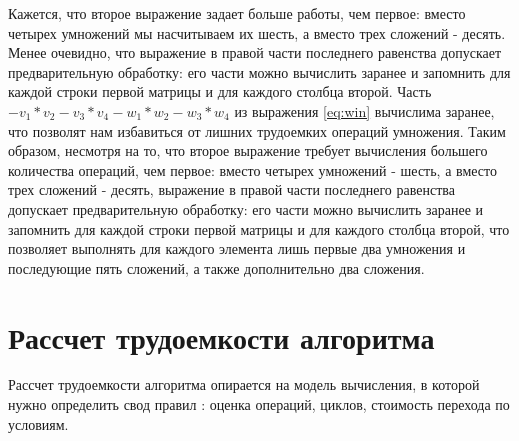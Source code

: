 Кажется, что второе выражение задает больше работы, чем первое: вместо четырех умножений мы насчитываем их шесть, а вместо трех сложений - десять. Менее очевидно, что выражение в правой части последнего равенства допускает предварительную обработку: его части можно вычислить заранее и запомнить для каждой строки первой матрицы и для каждого столбца второй. 
Часть $- v_1 * v_2 - v_3 * v_4 - w_1 * w_2 - w_3 * w_4$ из выражения \ref{eq:win} вычислима заранее, что позволят нам избавиться от лишних трудоемких операций умножения.
 Таким образом, несмотря на то, что второе выражение требует вычисления большего количества операций, чем первое: вместо четырех умножений - шесть, а вместо трех сложений - десять, выражение в правой части последнего равенства допускает предварительную обработку: его части можно вычислить заранее и запомнить для каждой строки первой матрицы и для каждого столбца второй, что позволяет выполнять для каждого элемента лишь первые два умножения и последующие пять сложений, а также дополнительно два сложения.


\section{ Рассчет трудоемкости алгоритма}

Рассчет трудоемкости алгоритма опирается на модель вычисления, в которой нужно определить свод правил : оценка операций, циклов, стоимость перехода по условиям.

